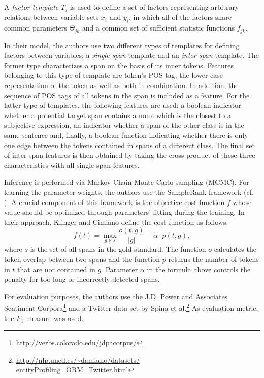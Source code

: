 \documentclass[a4paper,11pt]{article}
\begin{document}
A \emph{factor template} $T_j$ is used to define a set of factors representing
arbitrary relations between variable sets $x_i$ and $y_i$, in which all of the
factors share common parameters $\Theta_{jk}$ and a common set of sufficient
statistic functions ${f_{jk}}$.

In their model, the authors use two different types of templates for defining
factors between variables: a \emph{single span} template and an
\emph{inter-span} template.  The former type characterizes a span on the basis
of its inner tokens.  Features belonging to this type of template are token's
POS tag, the lower-case representation of the token as well as both in
combination.  In addition, the sequence of POS tags of all tokens in the span
is included as a feature.  For the latter type of templates, the following
features are used: a boolean indicator whether a potential target span
contains a noun which is the closest to a subjective expression, an indicator
whether a span of the other class is in the same sentence and, finally, a
boolean function indicating whether there is only one edge between the tokens
contained in spans of a different class.  The final set of inter-span features
is then obtained by taking the cross-product of these three characteristics
with all single span features.

Inference is performed via Markov Chain Monte Carlo sampling (MCMC).  For
learning the parameter weights, the authors use the SampleRank framework
(cf. \cite{Wick-11}).  A crucial component of this framework is the objective
cost function $f$ whose value should be optimized through parameters' fitting
during the training.  In their approach, Klinger and Cimiano define the cost
function as follows:
\begin{equation}
  f(t) = \max_{g \in s}\frac{o(t, g)}{|g|} - \alpha \cdot p(t, g),
\end{equation}
where $s$ is the set of all spans in the gold standard.  The function $o$
calculates the token overlap between two spans and the function $p$ returns
the number of tokens in $t$ that are not contained in $g$.  Parameter $\alpha$
in the formula above controls the penalty for too long or incorrectly detected
spans.

For evaluation purposes, the authors use the J.D. Power and Associates
Sentiment Corpora\footnote{\url{http://verbs.colorado.edu/jdpacorpus/}} and a
Twitter data set by Spina et
al.\footnote{\url{http://nlp.uned.es/~damiano/datasets/
    entityProfiling_ORM_Twitter.html}} As evaluation metric, the $F_1$ measure
was used.
\end{document}
